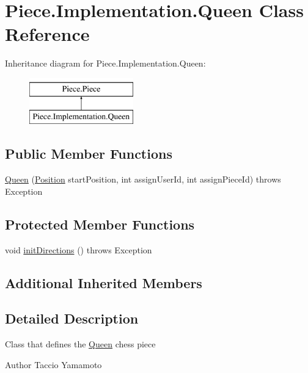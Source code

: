 \hypertarget{classPiece_1_1Implementation_1_1Queen}{\section{Piece.\-Implementation.\-Queen Class Reference}
\label{classPiece_1_1Implementation_1_1Queen}
}
Inheritance diagram for Piece.\-Implementation.\-Queen\-:\begin{figure}[H]
\begin{center}
\leavevmode
\includegraphics[height=2.000000cm]{classPiece_1_1Implementation_1_1Queen}
\end{center}
\end{figure}
\subsection*{Public Member Functions}
\begin{DoxyCompactItemize}
\item 
\hyperlink{classPiece_1_1Implementation_1_1Queen_a848b7ed8f769c62546d8b8445b30dd16}{Queen} (\hyperlink{classUtil_1_1Position}{Position} start\-Position, int assign\-User\-Id, int assign\-Piece\-Id)  throws Exception 
\end{DoxyCompactItemize}
\subsection*{Protected Member Functions}
\begin{DoxyCompactItemize}
\item 
void \hyperlink{classPiece_1_1Implementation_1_1Queen_a0f7958e2d7f880df8f012b814dd83329}{init\-Directions} ()  throws Exception 
\end{DoxyCompactItemize}
\subsection*{Additional Inherited Members}


\subsection{Detailed Description}
Class that defines the \hyperlink{classPiece_1_1Implementation_1_1Queen}{Queen} chess piece \begin{DoxyAuthor}{Author}
Taccio Yamamoto 
\end{DoxyAuthor}


